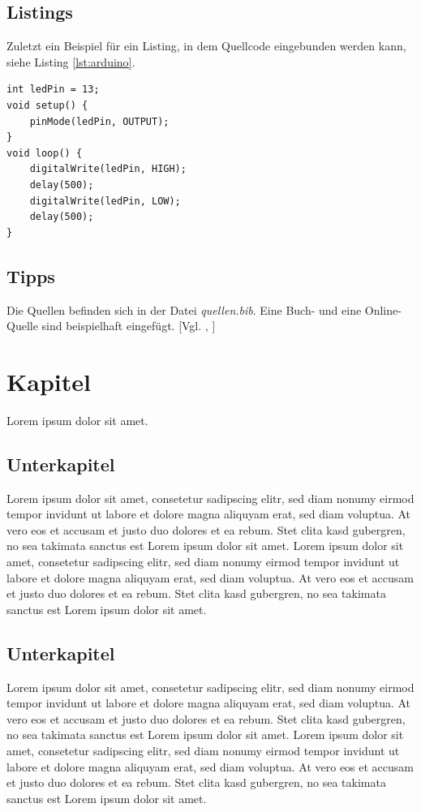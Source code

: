 \documentclass[12pt,a4paper,bibliography=totocnumbered,listof=totocnumbered]{scrartcl}
\begin{document}
\subsection{Listings}
Zuletzt ein Beispiel für ein Listing, in dem Quellcode eingebunden werden kann, siehe Listing \ref{lst:arduino}.

\vspace{1em}
\begin{lstlisting}[caption=Arduino Beispielprogramm, label=lst:arduino]
int ledPin = 13;
void setup() {
    pinMode(ledPin, OUTPUT);
}
void loop() {
    digitalWrite(ledPin, HIGH);
    delay(500);
    digitalWrite(ledPin, LOW);
    delay(500);
}
\end{lstlisting}

\subsection{Tipps}
Die Quellen befinden sich in der Datei \textit{quellen.bib}. Eine Buch- und eine Online-Quelle sind beispielhaft eingefügt. [Vgl. \cite{buch}, \cite{online}]

\pagebreak

\section{Kapitel}
Lorem ipsum dolor sit amet.

\subsection{Unterkapitel}
Lorem ipsum dolor sit amet, consetetur sadipscing elitr, sed diam nonumy eirmod tempor invidunt ut labore et dolore magna aliquyam erat, sed diam voluptua. At vero eos et accusam et justo duo dolores et ea rebum. Stet clita kasd gubergren, no sea takimata sanctus est Lorem ipsum dolor sit amet. Lorem ipsum dolor sit amet, consetetur sadipscing elitr, sed diam nonumy eirmod tempor invidunt ut labore et dolore magna aliquyam erat, sed diam voluptua. At vero eos et accusam et justo duo dolores et ea rebum. Stet clita kasd gubergren, no sea takimata sanctus est Lorem ipsum dolor sit amet.

\subsection{Unterkapitel}
Lorem ipsum dolor sit amet, consetetur sadipscing elitr, sed diam nonumy eirmod tempor invidunt ut labore et dolore magna aliquyam erat, sed diam voluptua. At vero eos et accusam et justo duo dolores et ea rebum. Stet clita kasd gubergren, no sea takimata sanctus est Lorem ipsum dolor sit amet. Lorem ipsum dolor sit amet, consetetur sadipscing elitr, sed diam nonumy eirmod tempor invidunt ut labore et dolore magna aliquyam erat, sed diam voluptua. At vero eos et accusam et justo duo dolores et ea rebum. Stet clita kasd gubergren, no sea takimata sanctus est Lorem ipsum dolor sit amet.
\pagebreak
\end{document}
